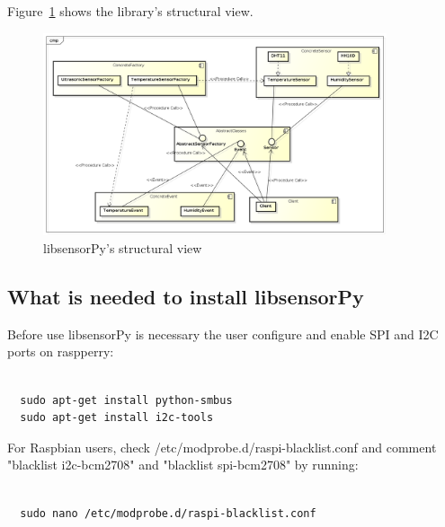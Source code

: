 \documentclass{acm_proc_article-sp}
\begin{document}
Figure~\ref{fig:view} shows the library's structural view.
\begin{figure}[h]
    \includegraphics[width=0.9\textwidth,natwidth=610,natheight=642]{pictures/VisaoEstrutural.png}
    \caption{libsensorPy's structural view}
    \label{fig:view}
\end{figure}

\subsection{What is needed to install libsensorPy}

Before use libsensorPy is necessary the user configure and enable SPI and I2C ports on raspperry:
\renewcommand{\theFancyVerbLine}{
  \sffamily\textcolor[rgb]{0.5,0.5,0.5}{\scriptsize\arabic{FancyVerbLine}}}
\begin{verbatim}

  sudo apt-get install python-smbus
  sudo apt-get install i2c-tools	

\end{verbatim}

For Raspbian users, check /etc/modprobe.d/raspi-blacklist.conf and comment "blacklist i2c-bcm2708" and "blacklist spi-bcm2708" by running:

\renewcommand{\theFancyVerbLine}{
  \sffamily\textcolor[rgb]{0.5,0.5,0.5}{\scriptsize\arabic{FancyVerbLine}}}
\begin{verbatim}

  sudo nano /etc/modprobe.d/raspi-blacklist.conf	

\end{verbatim}
\end{document}
